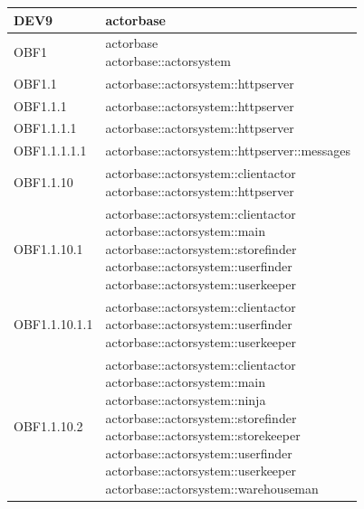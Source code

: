 \documentclass{scalatekids-article}
\begin{document}
\begin{longtable}[H]{|p{6cm}|p{11cm}|}
\hline
DEV9 & \multiLineCell[t]{actorbase\\}\\
\hline
OBF1 & \multiLineCell[t]{actorbase\\actorbase::actorsystem\\}\\
\hline
OBF1.1 & \multiLineCell[t]{actorbase::actorsystem::httpserver\\}\\
\hline
OBF1.1.1 & \multiLineCell[t]{actorbase::actorsystem::httpserver\\}\\
\hline
OBF1.1.1.1 & \multiLineCell[t]{actorbase::actorsystem::httpserver\\}\\
\hline
OBF1.1.1.1.1 & \multiLineCell[t]{actorbase::actorsystem::httpserver::messages\\}\\
\hline
OBF1.1.10 & \multiLineCell[t]{actorbase::actorsystem::clientactor\\actorbase::actorsystem::httpserver\\}\\
\hline
OBF1.1.10.1 & \multiLineCell[t]{actorbase::actorsystem::clientactor\\actorbase::actorsystem::main\\actorbase::actorsystem::storefinder\\actorbase::actorsystem::userfinder\\actorbase::actorsystem::userkeeper\\}\\
\hline
OBF1.1.10.1.1 & \multiLineCell[t]{actorbase::actorsystem::clientactor\\actorbase::actorsystem::userfinder\\actorbase::actorsystem::userkeeper\\}\\
\hline
OBF1.1.10.2 & \multiLineCell[t]{actorbase::actorsystem::clientactor\\actorbase::actorsystem::main\\actorbase::actorsystem::ninja\\actorbase::actorsystem::storefinder\\actorbase::actorsystem::storekeeper\\actorbase::actorsystem::userfinder\\actorbase::actorsystem::userkeeper\\actorbase::actorsystem::warehouseman\\}\\

\end{longtable}
\end{document}
